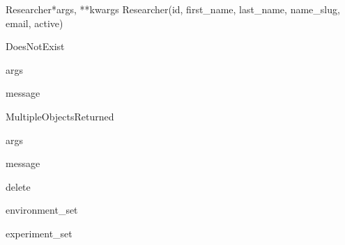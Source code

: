 \documentclass[letterpaper,10pt,english]{sphinxmanual}
\begin{document}
\hypertarget{data.models.Researcher}{}\begin{classdesc}{Researcher}{*args, **kwargs}
Researcher(id, first\_name, last\_name, name\_slug, email, active)

\hypertarget{data.models.Researcher.DoesNotExist}{}\begin{excdesc}{DoesNotExist}~

\hypertarget{data.models.Researcher.DoesNotExist.args}{}\begin{memberdesc}{args}\end{memberdesc}

\hypertarget{data.models.Researcher.DoesNotExist.message}{}\begin{memberdesc}{message}\end{memberdesc}
\end{excdesc}

\hypertarget{data.models.Researcher.MultipleObjectsReturned}{}\begin{excdesc}{MultipleObjectsReturned}~

\hypertarget{data.models.Researcher.MultipleObjectsReturned.args}{}\begin{memberdesc}{args}\end{memberdesc}

\hypertarget{data.models.Researcher.MultipleObjectsReturned.message}{}\begin{memberdesc}{message}\end{memberdesc}
\end{excdesc}

\hypertarget{data.models.Researcher.delete}{}\begin{methoddesc}[Researcher]{delete}{}\end{methoddesc}

\hypertarget{data.models.Researcher.environment_set}{}\begin{memberdesc}[Researcher]{environment\_set}\end{memberdesc}

\hypertarget{data.models.Researcher.experiment_set}{}\begin{memberdesc}[Researcher]{experiment\_set}\end{memberdesc}


\end{classdesc}
\end{document}
